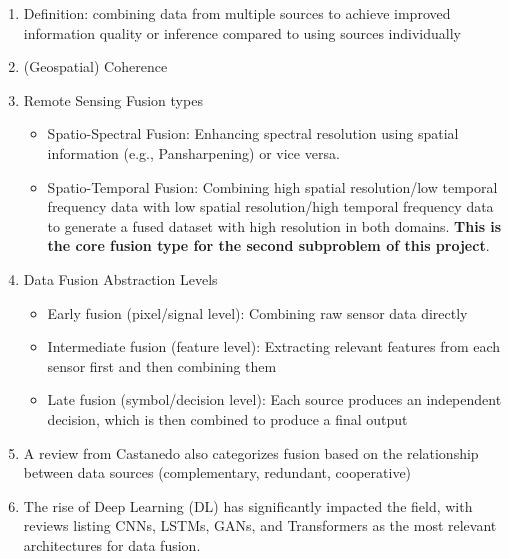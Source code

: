 \begin{multicols}{2}
\begin{enumerate}
    \item Definition: combining data from multiple sources to achieve improved information quality or inference compared to using sources individually\cite{Castanedo_trad_data_fusion_2013} 
    \item (Geospatial) Coherence\cite{Ghamisi_Multisource_and_Multitemporal_Data_Fusion_in_Remote_Sensing_2019}
    \item Remote Sensing Fusion types\cite{Ghamisi_Multisource_and_Multitemporal_Data_Fusion_in_Remote_Sensing_2019}\cite{Li_DL_multimodal_RS_data_fusion_review_2022}
    \begin{itemize}
        \item Spatio-Spectral Fusion: Enhancing spectral resolution using spatial information (e.g., Pansharpening) or vice versa.\cite{Ghamisi_Multisource_and_Multitemporal_Data_Fusion_in_Remote_Sensing_2019}\cite{Zhang_panchromatic_and_msi_fusion_for_RS_and_EO_2023}
        \item Spatio-Temporal Fusion: Combining high spatial resolution/low temporal frequency data with low spatial resolution/high temporal frequency data to generate a fused dataset with 
        high resolution in both domains.\cite{Ghamisi_Multisource_and_Multitemporal_Data_Fusion_in_Remote_Sensing_2019} \textbf{This is the core fusion type for the second subproblem of this project}. 
    \end{itemize}
    \item Data Fusion Abstraction Levels\cite{Hussain_DL_Data_Fusion_review_2024}
    \begin{itemize}
        \item Early fusion (pixel/signal level): Combining raw sensor data directly 
        \item Intermediate fusion (feature level): Extracting relevant features from each sensor first and then combining them
        \item Late fusion (symbol/decision level): Each source produces an independent decision, which is then combined to produce a final output
    \end{itemize}
    \item  A review from Castanedo\cite{Castanedo_trad_data_fusion_2013} also categorizes fusion based on the relationship between data sources (complementary, redundant, cooperative)
    \item The rise of Deep Learning (DL) has significantly impacted the field, with reviews listing CNNs, LSTMs, GANs, and Transformers as the most relevant architectures for data fusion\cite{Li_DL_multimodal_RS_data_fusion_review_2022}\cite{Hussain_DL_Data_Fusion_review_2024}.
\end{enumerate}

\end{multicols}